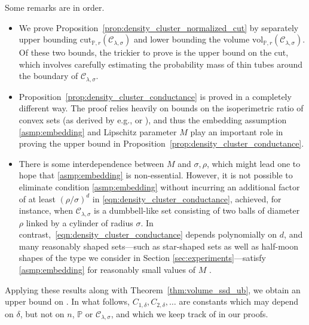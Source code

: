 \documentclass[twoside,11pt]{article}
\newcommand{\1}{\mathbf{1}}
\newcommand{\mc}[1]{\mathcal{#1}}
\newcommand{\Pbb}{\mathbb{P}}
\newcommand{\wh}[1]{\widehat{#1}}
\newcommand{\vol}{\mathrm{vol}}
\newcommand{\cut}{\mathrm{cut}}
\begin{document}
Some remarks are in order.
\begin{itemize}
	\item We prove Proposition~\ref{prop:density_cluster_normalized_cut} by separately upper bounding $\cut_{\Pbb,r}(\mc{C}_{\lambda,\sigma})$ and lower bounding the volume $\vol_{\Pbb,r}(\mc{C}_{\lambda,\sigma})$. Of these two bounds, the trickier to prove is the upper bound on the cut, which involves carefully estimating the probability mass of thin tubes around the boundary of $\mc{C}_{\lambda,\sigma}$. 
	\item Proposition~\ref{prop:density_cluster_conductance} is proved in a completely different way. The proof relies heavily on bounds on the isoperimetric ratio of convex sets (as derived by e.g., \cite{lovasz1990} or \cite{dyer1991b}), and thus the embedding assumption \ref{asmp:embedding} and Lipschitz parameter $M$
	play an important role in proving the upper bound in Proposition~\ref{prop:density_cluster_conductance}. 
	\item There is some interdependence between $M$ and $\sigma,\rho$, which might lead one to hope that \ref{asmp:embedding} is
	non-essential. However, it is not possible to eliminate condition \ref{asmp:embedding} without incurring an additional factor of at least
	$(\rho/\sigma)^d$ in \eqref{eqn:density_cluster_conductance}, achieved, for
	instance, when $\mc{C}_{\lambda,\sigma}$ is a dumbbell-like set consisting of two balls of diameter $\rho$ linked by a cylinder of radius $\sigma$. In contrast,~\eqref{eqn:density_cluster_conductance} depends polynomially on $d$, and many reasonably shaped sets---such as star-shaped sets as well as half-moon shapes of the type we consider in Section \ref{sec:experiments}---satisfy \ref{asmp:embedding} for reasonably small values of $M$ \citep{abbasi-yadkori2016a, abbasi-yadkori2016}.
\end{itemize}

Applying these results along with Theorem~\ref{thm:volume_ssd_ub}, we obtain an upper bound on \smash{$\Delta(\wh{C},\mc{C}_{\lambda,\sigma}[X])$}. In what follows, $C_{1,\delta},C_{2,\delta},\ldots$ are constants which may depend on $\delta$, but not on $n$, $\Pbb$ or $\mc{C}_{\lambda,\sigma}$, and which we keep track of in our proofs.
\end{document}
